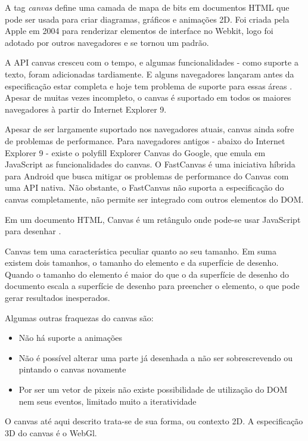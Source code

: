 \documentclass[
12pt,
a4paper,
portuges,
draft
]{report}
\begin{document}
A tag \textit{canvas} define uma camada de mapa de bits em documentos
HTML que pode ser usada para criar diagramas, gráficos e animações
2D. Foi criada pela Apple em 2004 para renderizar elementos de interface
no Webkit, logo foi adotado por outros navegadores e se tornou um
padrão.

A API canvas cresceu com o tempo, e algumas funcionalidades - como
suporte a texto, foram adicionadas tardiamente. E alguns navegadores
lançaram antes da especificação estar completa e hoje tem problema
de suporte para essas áreas \autocite{diveIntohtml}. Apesar de muitas
vezes incompleto, o canvas é suportado em todos os maiores navegadores
à partir do Internet Explorer 9.

Apesar de ser largamente suportado nos navegadores atuais, canvas ainda
sofre de problemas de performance. Para navegadores antigos - abaixo do
Internet Explorer 9 - existe o polyfill Explorer Canvas do Google, que
emula em JavaScript as funcionalidades do canvas. O FastCanvas é uma
iniciativa híbrida para Android que busca mitigar os problemas de
performance do Canvas com uma API nativa. Não obstante, o FastCanvas
não suporta a especificação do canvas completamente, não permite ser
integrado com outros elementos do DOM.

Em um documento HTML, Canvas é um retângulo onde pode-se usar
JavaScript para desenhar \autocite[pp. 113]{diveIntohtml}.

Canvas tem uma característica peculiar quanto ao seu tamanho.
Em suma existem dois tamanhos, o tamanho do elemento e da superfície de
desenho. Quando o tamanho do elemento é maior do que o da superfície
de desenho do documento escala a superfície de desenho para preencher o
elemento, o que pode gerar resultados inesperados.

Algumas outras fraquezas do canvas são:
\begin{itemize}
\item{Não há suporte a animações}
\item{Não é possível alterar uma parte já desenhada a não ser sobrescrevendo ou pintando o canvas novamente}
\item{Por ser um vetor de pixeis não existe possibilidade de utilização do DOM nem seus eventos, limitado muito a iteratividade}
\end{itemize}

O canvas até aqui descrito trata-se de sua forma, ou contexto 2D. A
especificação 3D do canvas é o WebGl.

\end{document}
